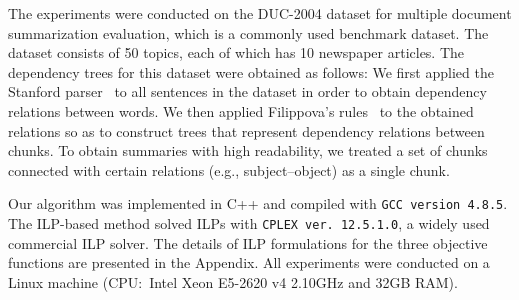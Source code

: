 \documentclass[11pt,a4paper]{article}
\begin{document}
	The experiments were conducted on the DUC-2004 dataset 
	for multiple document summarization evaluation, 
	which is a commonly used benchmark dataset. 
	The dataset consists of 50 topics, 
	each of which has 10 newspaper articles. 
	The dependency trees for this dataset were obtained as follows: 
	We first applied the Stanford parser~\cite{de2006generating}
	to all sentences in the dataset 
	in order to obtain dependency relations between words. 
	We then applied Filippova's rules~\cite{filippova08,filippova2013overcoming} 
	to the obtained relations 
	so as to construct trees that represent dependency relations 
	between chunks. 
	To obtain summaries with high readability, 
	we treated a set of chunks connected with certain relations 
	(e.g., subject--object) as a single chunk. 
	
	Our algorithm was implemented in C++ and 
	compiled with {\tt GCC version 4.8.5}. 
	The ILP-based method 
	solved ILPs with {\tt CPLEX ver. 12.5.1.0}, 
	a widely used commercial ILP solver. 
	The details of ILP formulations for the three objective functions are presented 
	in the Appendix. 
	All experiments were conducted on a Linux machine 
	(CPU:~Intel Xeon E5-2620 v4 2.10GHz and 32GB RAM).
	
\end{document}
